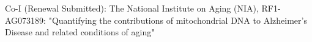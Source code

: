 
\item Co-I (Renewal Submitted): The National Institute on Aging (NIA), RF1-AG073189: "Quantifying the contributions of mitochondrial DNA to Alzheimer's Disease and related conditions of aging"



%
%
